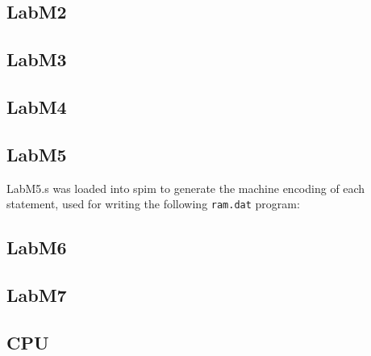 \documentclass{article}
\begin{document}
\subsection{LabM2}


\subsection{LabM3}


\subsection{LabM4}


\subsection{LabM5}


LabM5.s was loaded into spim to generate the machine encoding of each
statement, used for writing the following \verb$ram.dat$ program:


\subsection{LabM6}


\subsection{LabM7}


\subsection{CPU}


\end{document}
